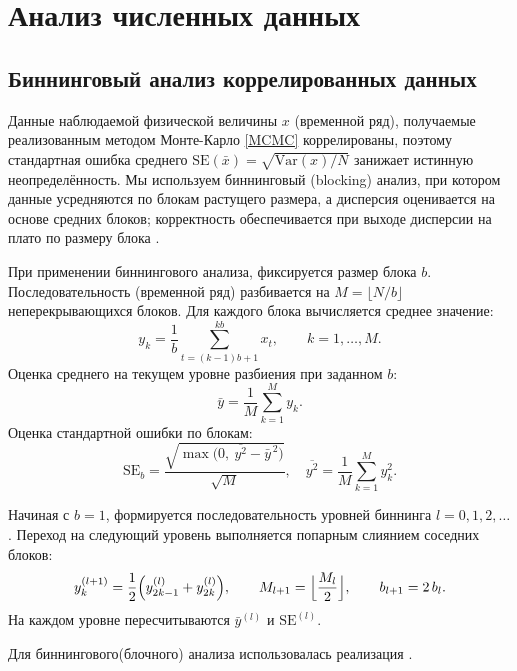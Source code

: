 \section{Анализ численных данных}
%
%

 
 
 \subsection{Биннинговый анализ коррелированных данных}
 \label{binning}
 
 
 Данные наблюдаемой физической величины $x$ (временной ряд), получаемые реализованным методом Монте-Карло \ref{MCMC} коррелированы, поэтому стандартная ошибка среднего \(\mathrm{SE}(\bar x)=\sqrt{\mathrm{Var}(x)/N}\) занижает истинную неопределённость.
 Мы используем биннинговый (blocking) анализ, при котором данные усредняются по блокам растущего размера, а дисперсия оценивается на основе средних блоков;  корректность обеспечивается при выходе дисперсии на плато по размеру блока \cite{10.1063/1.457480}.
 
 При применении биннингового анализа, фиксируется размер блока \(b\).  Последовательность (временной ряд) разбивается на \(M=\lfloor N/b\rfloor\) неперекрывающихся блоков. Для каждого блока вычисляется среднее значение:
 \[
 y_k=\frac{1}{b}\sum_{t=(k-1)b+1}^{kb} x_t,\qquad k=1,\dots,M.
 \]
 Оценка среднего на текущем уровне разбиения при заданном $b$:
 \[
 \bar y=\frac{1}{M}\sum_{k=1}^M y_k.
 \]
 Оценка стандартной ошибки по блокам:
 \[
 \mathrm{SE}_b=\frac{\sqrt{\max\!\bigl(0,\ \overline{y^2}-\bar y^{\,2}\bigr)}}{\sqrt{M}},
 \quad
 \overline{y^2}=\frac{1}{M}\sum_{k=1}^M y_k^2.
 \]
 
 Начиная с \(b=1\), формируется последовательность уровней биннинга \(l=0,1,2,\dots\).
 Переход на следующий уровень выполняется попарным слиянием соседних блоков:
 \[
 y^{(l+1)}_k=\frac{1}{2}\Bigl(y^{(l)}_{2k-1}+y^{(l)}_{2k}\Bigr),\qquad
 M_{l+1}=\Bigl\lfloor \frac{M_l}{2}\Bigr\rfloor,\qquad
 b_{l+1}=2\,b_l.
 \]
 На каждом уровне пересчитываются \(\bar y^{(l)}\) и \(\mathrm{SE}^{(l)}\).  
 
 Для биннингового(блочного) анализа использовалась реализация \cite{mc_lib_v041}.
 

